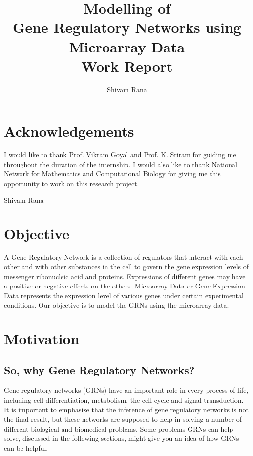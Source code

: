\documentclass[oneside, a4paper, 11pt]{book}
\title{\Huge \textbf{Modelling of\\Gene Regulatory Networks using Microarray Data}\\Work Report}
\author{Shivam Rana}
\begin{document}
\frontmatter
\date{}
\maketitle

\tableofcontents
\mainmatter


\chapter*{Acknowledgements}
I would like to thank \href{https://www.iiitd.edu.in/~vikram/}{Prof. Vikram Goyal} and \href{https://www.iiitd.ac.in/sriram}{Prof. K. Sriram} for guiding me throughout the duration of the internship.
I would also like to thank National Network for Mathematics and Computational Biology for giving me this opportunity to work on this research project.
\medskip
\medskip

Shivam Rana


\chapter{Objective}
\markboth{}{}
A Gene Regulatory Network is a collection of regulators that interact with each other and with other substances in the cell to govern the gene expression levels of messenger ribonucleic acid and proteins. Expressions of different genes may have a positive or negative effects on the others. Microarray Data or Gene Expression Data represents the expression level of various genes under certain experimental conditions. Our objective is to model the GRNs using the microarray data.


\chapter{Motivation}
\markboth{}{}
\section{So, why Gene Regulatory Networks?}
Gene regulatory networks (GRNs) have an important role in every process of life, including cell differentiation, metabolism, the cell cycle and signal transduction. It is important to emphasize that the inference of gene regulatory networks is not the final result, but these networks are supposed to help in solving a number of different biological and biomedical problems. Some problems GRNs can help solve, discussed in the following sections, might give you an idea of how GRNs can be helpful.
\end{document}
